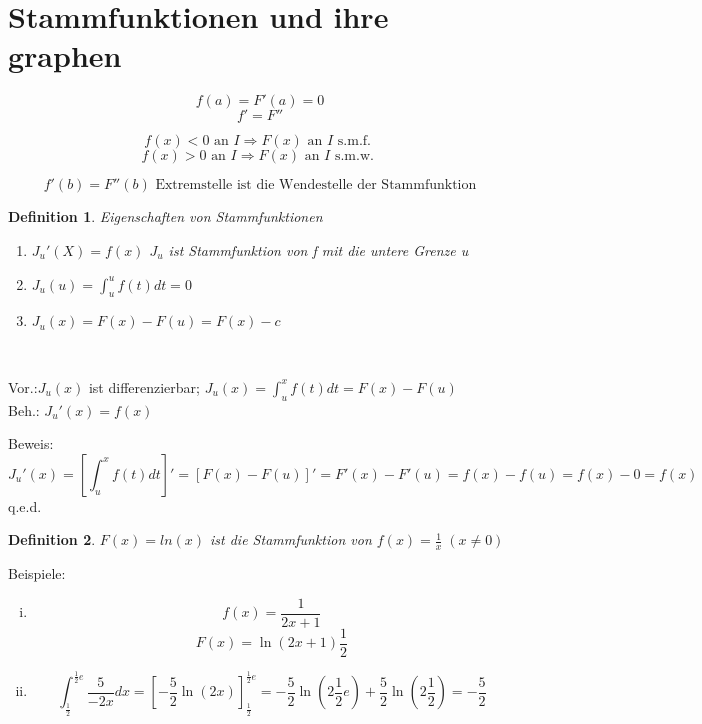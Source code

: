 \documentclass{article}
\newtheorem{definition}{Definition}
\begin{document}
\section{Stammfunktionen und ihre graphen}

\[f(a) = F'(a) = 0\]
\[f' = F''\]  

\[f(x) < 0 \text{ an } I \Rightarrow F(x) \text{ an } I \text{ s.m.f. }\]
\[f(x) > 0 \text{ an } I \Rightarrow F(x) \text{ an } I \text{ s.m.w. }\]

\[f'(b) = F''(b) \text{ Extremstelle ist die Wendestelle der Stammfunktion}\]


\begin{definition}
Eigenschaften von Stammfunktionen
\begin{enumerate}[(1)] 

\item $J_u'(X) = f(x) $ $ J_u$ ist Stammfunktion von f mit die untere Grenze u
\item $ J_u(u) = \int_u^u f(t) dt = 0$
\item $J_u(x) = F(x) - F(u) = F(x) - c$
\end{enumerate}
\end{definition}

\\
\raggedright
Vor.:$J_u(x) $ ist differenzierbar; $J_u(x) = \int_u^xf(t)dt = F(x) -F(u)$
\\
Beh.: $ J_u'(x) = f(x)$

Beweis:
\[J_u'(x) = [\int_u^xf(t)dt]' = [F(x) - F(u)]' = F'(x) - F'(u) = f(x) - f(u) = f(x) -  0 = f(x)\]
q.e.d.


\begin{definition}

$F(x) = ln(x) $ ist die Stammfunktion von $ f(x) = \frac 1x \; (x \not=0)$

\end{definition}

Beispiele:
\begin{enumerate}[i)]
\item \[f(x) = \frac1{2x+1}\]\[ F(x) = \ln(2x+1) \frac 12\]

\item \[\int_{\frac12}^{\frac12 e} \frac5{-2x}dx =  [-\frac52\ln(2x)]_{\frac12}^{\frac12 e} = -\frac52\ln(2\frac12e) + \frac52\ln(2\frac12) = -\frac 52\]

\end{enumerate}
\end{document}
